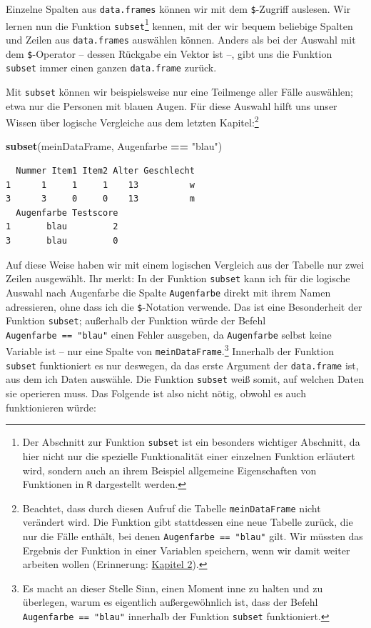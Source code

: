 \documentclass[12pt,]{tufte-book}
\newenvironment{Shaded}{\begin{snugshade}}{\end{snugshade}}
\newcommand{\KeywordTok}[1]{\textcolor[rgb]{0.13,0.29,0.53}{\textbf{#1}}}
\newcommand{\StringTok}[1]{\textcolor[rgb]{0.31,0.60,0.02}{#1}}
\newcommand{\OperatorTok}[1]{\textcolor[rgb]{0.81,0.36,0.00}{\textbf{#1}}}
\newcommand{\NormalTok}[1]{#1}
\theoremstyle{definition}
\theoremstyle{definition}
\theoremstyle{definition}
\theoremstyle{remark}
\begin{document}
Einzelne Spalten aus \texttt{data.frames} können wir mit dem
\texttt{\$}-Zugriff auslesen. Wir lernen nun die Funktion
\texttt{subset}\footnote{Der Abschnitt zur Funktion \texttt{subset} ist
  ein besonders wichtiger Abschnitt, da hier nicht nur die spezielle
  Funktionalität einer einzelnen Funktion erläutert wird, sondern auch
  an ihrem Beispiel allgemeine Eigenschaften von Funktionen in
  \texttt{R} dargestellt werden.} kennen, mit der wir bequem beliebige
Spalten und Zeilen aus \texttt{data.frames} auswählen können. Anders als
bei der Auswahl mit dem \texttt{\$}-Operator -- dessen Rückgabe ein
Vektor ist --, gibt uns die Funktion \texttt{subset} immer einen ganzen
\texttt{data.frame} zurück.

Mit \texttt{subset} können wir beispielsweise nur eine Teilmenge aller
Fälle auswählen; etwa nur die Personen mit blauen Augen. Für diese
Auswahl hilft uns unser Wissen über logische Vergleiche aus dem letzten
Kapitel:\footnote{Beachtet, dass durch diesen Aufruf die Tabelle
  \texttt{meinDataFrame} nicht verändert wird. Die Funktion gibt
  stattdessen eine neue Tabelle zurück, die nur die Fälle enthält, bei
  denen \texttt{Augenfarbe\ ==\ "blau"} gilt. Wir müssten das Ergebnis
  der Funktion in einer Variablen speichern, wenn wir damit weiter
  arbeiten wollen (Erinnerung:
  \protect\hyperlink{ausgabevsabspeichern}{Kapitel 2}).}

\begin{Shaded}
\begin{Highlighting}[]
\KeywordTok{subset}\NormalTok{(meinDataFrame, Augenfarbe }\OperatorTok{==}\StringTok{ "blau"}\NormalTok{)}
\end{Highlighting}
\end{Shaded}

\begin{verbatim}
  Nummer Item1 Item2 Alter Geschlecht
1      1     1     1    13          w
3      3     0     0    13          m
  Augenfarbe Testscore
1       blau         2
3       blau         0
\end{verbatim}

Auf diese Weise haben wir mit einem logischen Vergleich aus der Tabelle
nur zwei Zeilen ausgewählt. Ihr merkt: In der Funktion \texttt{subset}
kann ich für die logische Auswahl nach Augenfarbe die Spalte
\texttt{Augenfarbe} direkt mit ihrem Namen adressieren, ohne dass ich
die \texttt{\$}-Notation verwende. Das ist eine Besonderheit der
Funktion \texttt{subset}; außerhalb der Funktion würde der Befehl
\texttt{Augenfarbe\ ==\ "blau"} einen Fehler ausgeben, da
\texttt{Augenfarbe} selbst keine Variable ist -- nur eine Spalte von
\texttt{meinDataFrame}.\footnote{Es macht an dieser Stelle Sinn, einen
  Moment inne zu halten und zu überlegen, warum es eigentlich
  außergewöhnlich ist, dass der Befehl \texttt{Augenfarbe\ ==\ "blau"}
  innerhalb der Funktion \texttt{subset} funktioniert.} Innerhalb der
Funktion \texttt{subset} funktioniert es nur deswegen, da das erste
Argument der \texttt{data.frame} ist, aus dem ich Daten auswähle. Die
Funktion \texttt{subset} weiß somit, auf welchen Daten sie operieren
muss. Das Folgende ist also nicht nötig, obwohl es auch funktionieren
würde:
\end{document}
